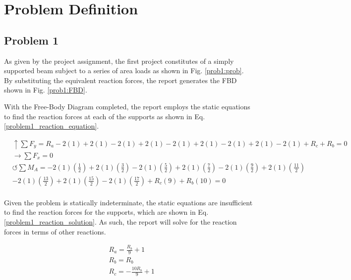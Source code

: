 \documentclass[a4paper]{article}
\begin{document}
\section{Problem Definition} \label{Problems}
\subsection{Problem 1}

As given by the project assignment, the first project constitutes of a simply supported beam subject to a series of area loads as shown in Fig. \ref{prob1:prob}. By substituting the equivalent reaction forces, the report generates the FBD shown in Fig. \ref{prob1:FBD}.


With the Free-Body Diagram completed, the report employs the static equations to find the reaction forces at each of the supports as shown in Eq. \ref{problem1_reaction_equation}.

\begin{equation}
\begin{split}
	&\uparrow \sum F_y = R_a - 2(1) + 2(1) - 2(1) + 2(1) - 2(1) + 2(1) - 2(1) + 2(1) - 2(1) + R_c + R_b = 0 \\
 	&\rightarrow \sum F_x = 0 \\
 	&\circlearrowleft \sum M_A = -2(1)\left(\frac{1}{2}\right) + 2(1)\left(\frac{3}{2}\right) - 2(1)\left(\frac{5}{2}\right) + 2(1)\left(\frac{7}{2}\right) - 2(1)\left(\frac{9}{2}\right) + 2(1)\left(\frac{11}{2}\right) \\ 
	& - 2(1)\left(\frac{13}{2}\right) + 2(1)\left(\frac{15}{2}\right) - 2(1)\left(\frac{17}{2}\right)  + R_c(9) + R_b(10) = 0 \\
\end{split}
\label{problem1_reaction_equation}
\end{equation}

Given the problem is statically indeterminate, the static equations are insufficient to find the reaction forces for the supports, which are shown in Eq. \ref{problem1_reaction_solution}. As such, the report will solve for the reaction forces in terms of other reactions.

\begin{equation}
\begin{split}
	& R_a = \frac{R_b}{9} + 1 \\
	& R_b = R_b \\
	& R_c = -\frac{10R_b}{9} + 1 \\
\end{split}
\label{problem1_reaction_solution}
\end{equation}
\end{document}
